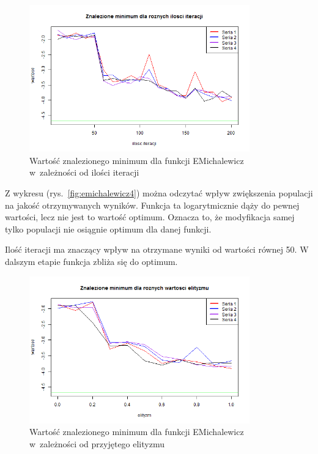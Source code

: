 \documentclass[11pt, a4paper]{article}
\newcommand{\fbi}{\leavevmode{\parindent=1em\indent}}
\begin{document}
\begin{figure}[H]
	\begin{center}
		\includegraphics[width=0.85\textwidth]{./assets/EMichalewicz5.png}
		\caption{Wartość znalezionego minimum dla funkcji EMichalewicz w~zależności od ilości iteracji}
		\label{fig:emichalewicz5}
	\end{center}
\end{figure}

\fbi
Z wykresu (rys.~\ref{fig:emichalewicz4}) można odczytać wpływ zwiększenia populacji na jakość otrzymywanych wyników. Funkcja ta logarytmicznie dąży do pewnej wartości, lecz nie jest to wartość optimum. Oznacza to, że modyfikacja samej tylko populacji nie osiągnie optimum dla danej funkcji.

\fbi
Ilość iteracji ma znaczący wpływ na otrzymane wyniki od wartości równej 50. W dalszym etapie funkcja zbliża się do optimum.

\begin{figure}[H]
	\begin{center}
		\includegraphics[width=0.85\textwidth]{./assets/EMichalewicz6.png}
		\caption{Wartość znalezionego minimum dla funkcji EMichalewicz w~zależności od przyjętego elityzmu}
		\label{fig:emichalewicz6}
	\end{center}
\end{figure}
\end{document}
